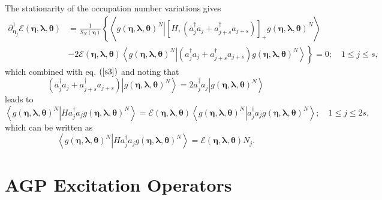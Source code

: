 \documentclass[aps,preprint]{revtex4}%
\begin{document}
The stationarity of the occupation number variations gives
\begin{align}
\partial_{\bm{\eta}_{j}}^{1}\mathcal{E}\left(
\bm{\eta},\bm{\lambda},\bm{\theta}\right)   &  =\frac{1}{S_{N}\left(
\bm{\eta}\right)  }\left\{  \left\langle \left.  g\left(
\bm{\eta },\bm{\lambda},\bm{\theta}\right)  ^{N}\right\vert \left[  H,\left(
a_{j}^{\dagger}a_{j}+a_{j+s}^{\dagger}a_{j+s}\right)  \right]  _{+}g\left(
\bm{\eta},\bm{\lambda},\bm{\theta}\right)  ^{N}\right\rangle \right.
\nonumber\\
&  -\left.  2\mathcal{E}\left(  \bm{\eta},\bm{\lambda},\bm{\theta }\right)
\left\langle \left.  g\left(  \bm{\eta},\bm{\lambda },\bm{\theta}\right)
^{N}\right\vert \left(  a_{j}^{\dagger}a_{j}+a_{j+s}^{\dagger}a_{j+s}\right)
g\left(  \bm{\eta},\bm{\lambda },\bm{\theta}\right)  ^{N}\right\rangle
\right\}  =0;\quad1\leq j\leq s,
\end{align}
which combined with eq. $\left(  \ref{s3}\right)  $ and noting that
\begin{equation}
\left(  a_{j}^{\dagger}a_{j}+a_{j+s}^{\dagger}a_{j+s}\right)  \left\vert
g\left(  \bm{\eta},\bm{\lambda},\bm{\theta}\right)  ^{N}\right\rangle
=2a_{j}^{\dagger}a_{j}\left\vert g\left(
\bm{\eta },\bm{\lambda},\bm{\theta}\right)  ^{N}\right\rangle
\end{equation}
leads to
\begin{equation}
\left\langle \left.  g\left(  \bm{\eta},\bm{\lambda},\bm{\theta }\right)
^{N}\right\vert Ha_{j}^{\dagger}a_{j}g\left(
\bm{\eta },\bm{\lambda},\bm{\theta}\right)  ^{N}\right\rangle =\mathcal{E}%
\left(  \bm{\eta},\bm{\lambda},\bm{\theta}\right)  \left\langle \left.
g\left(  \bm{\eta},\bm{\lambda},\bm{\theta}\right)  ^{N}\right\vert
a_{j}^{\dagger}a_{j}g\left(  \bm{\eta},\bm{\lambda },\bm{\theta}\right)
^{N}\right\rangle ;\quad1\leq j\leq2s,
\end{equation}
which can be written as
\begin{equation}
\left\langle \left.  g\left(  \bm{\eta},\bm{\lambda},\bm{\theta }\right)
^{N}\right\vert Ha_{j}^{\dagger}a_{j}g\left(
\bm{\eta },\bm{\lambda},\bm{\theta}\right)  ^{N}\right\rangle =\mathcal{E}%
\left(  \bm{\eta},\bm{\lambda},\bm{\theta}\right)  N_{j}.
\end{equation}


\section{AGP Excitation Operators\label{q_op}}
\end{document}

